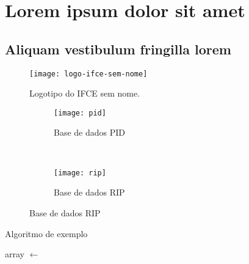 \chapter{Lorem ipsum dolor sit amet}\label{cap:exampleChapter}
\section{Aliquam vestibulum fringilla lorem}

\lipsum[1]

\begin{figure}[H]
    \begin{center}
      \label{fig:1}
      \caption{Logotipo do IFCE sem nome.}
      \texttt{[image: logo-ifce-sem-nome]}
      \newline 
    \end{center}
  \end{figure}

\lipsum[2-3]


\lipsum[2-3]
\begin{figure}
    \centering
    \caption{Exemplo de gráfico}\label{fig:animals}
    \begin{subfigure}[b]{0.45\textwidth}
        \texttt{[image: pid]}
        \caption{Base de dados PID}
        \label{fig:pid}
    \end{subfigure}
    ~ 
    \begin{subfigure}[b]{0.45\textwidth}
        \texttt{[image: rip]}
        \caption{Base de dados RIP}
        \label{fig:rip}
    \end{subfigure}
      \newline 
\end{figure}


\lipsum[2]

\begin{algorithm}
\caption{Algoritmo de exemplo}\label{bogosort}
  \begin{algorithmic}[1]
    \State array $\gets$  
    \EndWhile
  \EndProcedure
  \end{algorithmic}
\end{algorithm}

\lipsum[1]